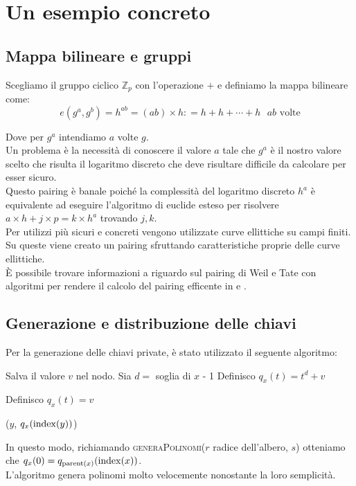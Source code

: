 \chapter{Un esempio concreto}

\section{Mappa bilineare e gruppi}

Scegliamo il gruppo ciclico $\mathbb{Z}_{p}$ con l'operazione $+$ e definiamo la mappa bilineare come:
\[ e(g^a,g^b) = h^{ab} = (ab) \times h : = h + h + \cdots + h \text{ $ab$ volte}\]

Dove per $g^a$ intendiamo $a$ volte $g$.\\


Un problema è la necessità di conoscere il valore $a$ tale che $g^a$ è il nostro valore scelto che risulta il logaritmo discreto che deve risultare difficile da calcolare per esser sicuro.\\
Questo pairing è banale poiché la complessità del logaritmo discreto $h^a$ è equivalente ad eseguire l'algoritmo di euclide esteso per risolvere $a \times h + j \times p = k \times h^a$ trovando $j,k$.\\


Per utilizzi più sicuri e concreti vengono utilizzate curve ellittiche su campi finiti. Su queste viene creato un pairing sfruttando caratteristiche proprie delle curve ellittiche.\\
È possibile trovare informazioni a riguardo sul pairing di Weil e Tate con algoritmi per rendere il calcolo del pairing efficente in \cite{benoit} e \cite{maas}.


\section{Generazione e distribuzione delle chiavi}

Per la generazione delle chiavi private, è stato utilizzato il seguente algoritmo:
\vspace{0.3cm}
\begin{algorithmic}
   		\State Salva il valore $v$ nel nodo.
   \Else
   		\State Sia $d = $ soglia di $x$ - 1
   			\State Definisco $q_x(t) = t^d + v$ 
   		
   		\Else
   			\State Definisco $q_x(t) = v$
   		
   		\EndIf

   			($y$, $q_x(\operatorname{index}(y))$) 
   		\EndFor
   \EndIf
\EndFunction
\end{algorithmic}
\vspace{0.3cm}
In questo modo, richiamando {\scshape generaPolinomi}($r$ radice dell'albero, $s$) otteniamo che $q_x(0) = q_{\operatorname{parent}(x)}(\operatorname{index}(x))$.\\[0.1cm]
L'algoritmo genera polinomi molto velocemente nonostante la loro semplicità.\label{polinomi}\\[1cm]


